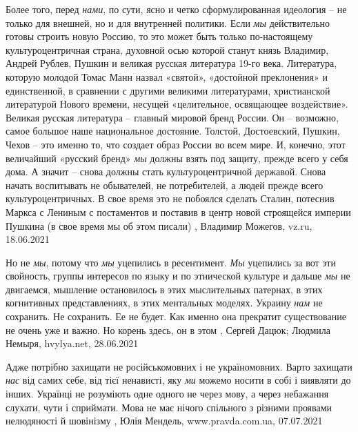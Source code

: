 Более того, перед \emph{нами}, по сути, ясно и четко сформулированная идеология – не
только для внешней, но и для внутренней политики. Если \emph{мы} действительно готовы
строить новую Россию, то это может быть только по-настоящему культуроцентричная
страна, духовной осью которой станут князь Владимир, Андрей Рублев, Пушкин и
великая русская литература 19-го века. Литература, которую молодой Томас Манн
назвал «святой», «достойной преклонения» и единственной, в сравнении с другими
великими литературами, христианской литературой Нового времени, несущей
«целительное, освящающее воздействие».  Великая русская литература – главный
мировой бренд России. Он – возможно, самое большое наше национальное достояние.
Толстой, Достоевский, Пушкин, Чехов – это именно то, что создает образ России
во всем мире. И, конечно, этот величайший «русский бренд» \emph{мы} должны взять под
защиту, прежде всего у себя дома. А значит – снова должны стать
культуроцентричной державой. Снова начать воспитывать не обывателей, не
потребителей, а людей прежде всего культуроцентричных. В свое время это не
побоялся сделать Сталин, потеснив Маркса с Лениным с постаментов и поставив в
центр новой строящейся империи Пушкина (в свое время мы об этом писали)
, 
Владимир Можегов, vz.ru, 18.06.2021

Но не \emph{мы}, потому что \emph{мы} уцепились в ресентимент. \emph{Мы} уцепились за вот эти
свойность, группы интересов по языку и по этнической культуре и дальше \emph{мы} не
двигаемся, мышление остановилось в этих мыслительных патернах, в этих
когнитивных представлениях, в этих ментальных моделях. Украину \emph{нам} не
сохранить. Не сохранить. Ее не будет. Как именно она прекратит существование не
очень уже и важно. Но корень здесь, он в этом
, 
Сергей Дацюк; Людмила Немыря, hvylya.net, 28.06.2021

Адже потрібно захищати не російськомовних і не україномовних. Варто захищати
\emph{нас} від самих себе, від тієї ненависті, яку \emph{ми} можемо носити в
собі і виявляти до інших. Українці не розуміють одне одного не через мову, а
через небажання слухати, чути і сприймати.  Мова не має нічого спільного з
різними проявами нелюдяності й шовінізму
, 
Юлія Мендель, www.pravda.com.ua, 07.07.2021
